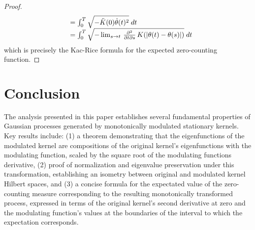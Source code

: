 \documentclass{mc}
\begin{document}
\begin{proof}
\begin{equation}
\begin{array}{ll}
      & = \int_0^T \sqrt{- \ddot{K} (0) \dot{\theta} (t)^2}  \hspace{0.27em}
      dt\\
      & = \int_0^T \sqrt{- \lim_{s \to t}  \hspace{0.17em}
      \frac{\partial^2}{\partial t \partial s}  \hspace{0.17em} K (| \theta
      (t) - \theta (s) |)}  \hspace{0.27em} dt
    \end{array}
  \end{equation}
  which is precisely the Kac-Rice formula for the expected zero-counting
  function.
\end{proof}

\section{Conclusion}

The analysis presented in this paper establishes several fundamental
properties of Gaussian processes generated by monotonically modulated
stationary kernels. Key results include: (1) a theorem demonstrating that the
eigenfunctions of the modulated kernel are compositions of the original
kernel's eigenfunctions with the modulating function, scaled by the square
root of the modulating functions derivative, (2) proof of normalization and
eigenvalue preservation under this transformation, establishing an isometry
between original and modulated kernel Hilbert spaces, and (3) a concise
formula for the expectated value of the zero-counting measure corresponding to
the resulting monotonically transformed process, expressed in terms of the
original kernel's second derivative at zero and the modulating function's
values at the boundaries of the interval to which the expectation corresponds.



\end{document}
